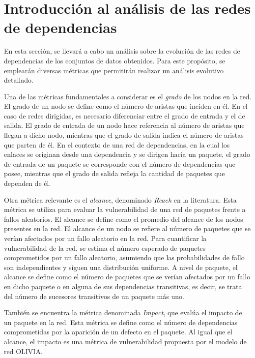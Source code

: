 \section{Introducción al análisis de las redes de dependencias}

En esta sección, se llevará a cabo un análisis sobre la evolución de las redes de dependencias de los conjuntos
de datos obtenidos. Para este propósito, se emplearán diversas métricas que permitirán realizar un análisis
evolutivo detallado.

Una de las métricas fundamentales a considerar es el \emph{grado} de los nodos en la red. El grado de un nodo
se define como el número de aristas que inciden en él. En el caso de redes dirigidas, es necesario diferenciar
entre el grado de entrada y el de salida. El grado de entrada de un nodo hace referencia al número de aristas
que llegan a dicho nodo, mientras que el grado de salida indica el número de aristas que parten de él. En el
contexto de una red de dependencias, en la cual los enlaces se originan desde una dependencia y se dirigen hacia
un paquete, el grado de entrada de un paquete se corresponde con el número de dependencias que posee, mientras
que el grado de salida refleja la cantidad de paquetes que dependen de él.

Otra métrica relevante es el \emph{alcance}, denominado \emph{Reach} en la literatura. Esta métrica se utiliza
para evaluar la vulnerabilidad de una red de paquetes frente a fallos aleatorios. El alcance se define como el
promedio del alcance de los nodos presentes en la red. El alcance de un nodo se refiere al número de paquetes
que se verían afectados por un fallo aleatorio en la red. Para cuantificar la vulnerabilidad de la red, se estima
el número esperado de paquetes comprometidos por un fallo aleatorio, asumiendo que las probabilidades de fallo
son independientes y siguen una distribución uniforme. A nivel de paquete, el alcance se define como el número
de paquetes que se verían afectados por un fallo en dicho paquete o en alguna de sus dependencias transitivas,
es decir, se trata del número de sucesores transitivos de un paquete más uno.

También se encuentra la métrica denominada \emph{Impact}, que evalúa el impacto de un paquete en la red.
Esta métrica se define como el número de dependencias comprometidas por la aparición de un defecto en el paquete.
Al igual que el alcance, el impacto es una métrica de vulnerabilidad propuesta por el modelo de red OLIVIA. \cite{Seto-Rey20231}

